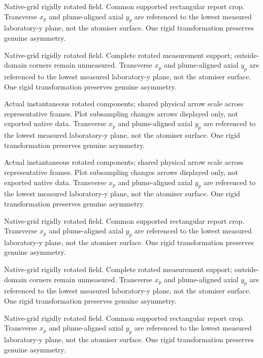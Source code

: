 \caption{Native-grid rigidly rotated field. Common supported rectangular report crop. Transverse $x_p$ and plume-aligned axial $y_p$ are referenced to the lowest measured laboratory-y plane, not the atomiser surface. One rigid transformation preserves genuine asymmetry.}

\caption{Native-grid rigidly rotated field. Complete rotated measurement support; outside-domain corners remain unmeasured. Transverse $x_p$ and plume-aligned axial $y_p$ are referenced to the lowest measured laboratory-y plane, not the atomiser surface. One rigid transformation preserves genuine asymmetry.}

\caption{Actual instantaneous rotated components; shared physical arrow scale across representative frames. Plot subsampling changes arrows displayed only, not exported native data. Transverse $x_p$ and plume-aligned axial $y_p$ are referenced to the lowest measured laboratory-y plane, not the atomiser surface. One rigid transformation preserves genuine asymmetry.}

\caption{Actual instantaneous rotated components; shared physical arrow scale across representative frames. Plot subsampling changes arrows displayed only, not exported native data. Transverse $x_p$ and plume-aligned axial $y_p$ are referenced to the lowest measured laboratory-y plane, not the atomiser surface. One rigid transformation preserves genuine asymmetry.}

\caption{Native-grid rigidly rotated field. Common supported rectangular report crop. Transverse $x_p$ and plume-aligned axial $y_p$ are referenced to the lowest measured laboratory-y plane, not the atomiser surface. One rigid transformation preserves genuine asymmetry.}

\caption{Native-grid rigidly rotated field. Complete rotated measurement support; outside-domain corners remain unmeasured. Transverse $x_p$ and plume-aligned axial $y_p$ are referenced to the lowest measured laboratory-y plane, not the atomiser surface. One rigid transformation preserves genuine asymmetry.}

\caption{Native-grid rigidly rotated field. Common supported rectangular report crop. Transverse $x_p$ and plume-aligned axial $y_p$ are referenced to the lowest measured laboratory-y plane, not the atomiser surface. One rigid transformation preserves genuine asymmetry.}

